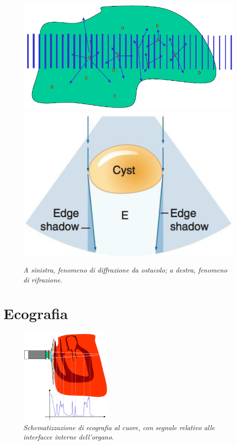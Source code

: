 \documentclass{report}
\numberwithin{equation}{section}
\numberwithin{figure}{section}
\begin{document}
\begin{figure}[htp]
\centering
\includegraphics[scale=0.62]{immagini/diffrazione.png}\quad\includegraphics[scale=0.66]{immagini/rifrazione.png}
\caption{\label{fig:rifrazione} \textit{A sinistra, fenomeno di diffrazione da ostacolo; a destra, fenomeno di rifrazione}.}
\end{figure}

\section{Ecografia}

\begin{figure}
    \centering
    \includegraphics[width=0.4\textwidth]{immagini/ecocuore.png}
    \caption{\textit{Schematizzazione di ecografia al cuore, con segnale relativo alle interfacce interne dell'organo}.}
    \label{fig:ecocuore}
\end{figure}
\end{document}
